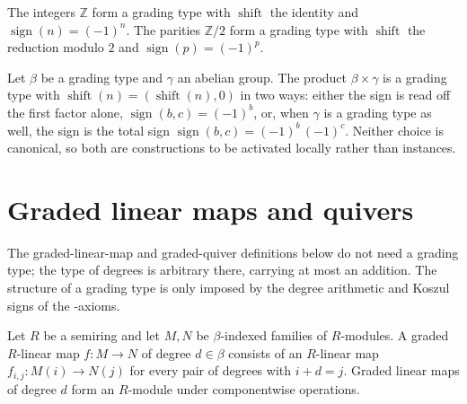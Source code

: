 \begin{definition}
\label{AInfinityTheory.GradingType.standard}
\leanok
{}
The integers $\mathbb{Z}$ form a grading type with $\operatorname{shift}$ the
identity and $\operatorname{sign}(n) = (-1)^n$. The parities $\mathbb{Z}/2$
form a grading type with $\operatorname{shift}$ the reduction modulo $2$ and
$\operatorname{sign}(p) = (-1)^p$.
\end{definition}

\begin{definition}
\label{AInfinityTheory.GradingType.prod}
\leanok
{}
Let $\beta$ be a grading type and $\gamma$ an abelian group. The product
$\beta \times \gamma$ is a grading type with
$\operatorname{shift}(n) = (\operatorname{shift}(n), 0)$ in two ways: either
the sign is read off the first factor alone, $\operatorname{sign}(b,c) = (-1)^b$,
or, when $\gamma$ is a grading type as well, the sign is the total sign
$\operatorname{sign}(b,c) = (-1)^b\,(-1)^c$. Neither choice is canonical, so
both are constructions to be activated locally rather than instances.
\end{definition}

\section{Graded linear maps and quivers}

The graded-linear-map and graded-quiver definitions below do not need a grading
type; the type of degrees is arbitrary there, carrying at most an addition. The
structure of a grading type is only imposed by the degree arithmetic and Koszul
signs of the \Ainf{}-axioms.

\begin{definition}
\label{AInfinityTheory.GradedLinearMap}
\leanok
Let $R$ be a semiring and let $M, N$ be $\beta$-indexed families of $R$-modules.
A graded $R$-linear map $f : M \to N$ of degree $d \in \beta$ consists of an
$R$-linear map $f_{i,j} : M(i) \to N(j)$ for every pair of degrees with
$i + d = j$. Graded linear maps of degree $d$ form an $R$-module under
componentwise operations.
\end{definition}

